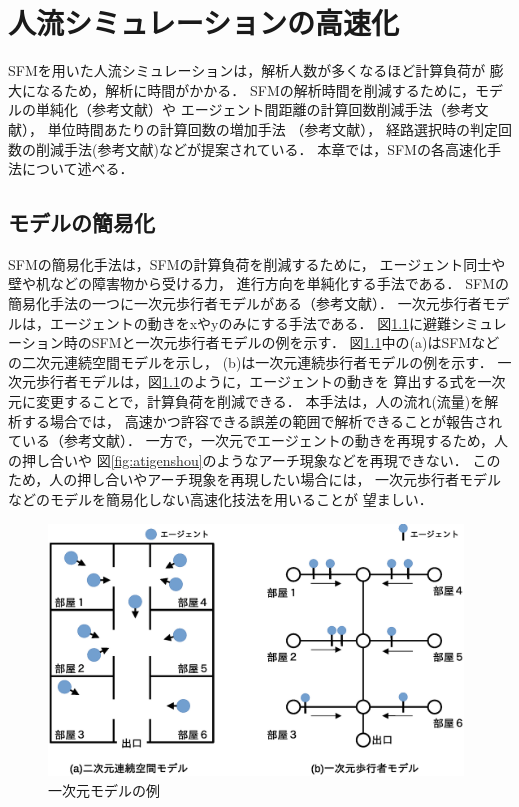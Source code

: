 \chapter{人流シミュレーションの高速化}
\label{sec:survey}
SFMを用いた人流シミュレーションは，解析人数が多くなるほど計算負荷が
膨大になるため，解析に時間がかかる．
SFMの解析時間を削減するために，モデルの単純化（参考文献）や
エージェント間距離の計算回数削減手法（参考文献），
単位時間あたりの計算回数の増加手法 （参考文献），
経路選択時の判定回数の削減手法(参考文献)などが提案されている．
本章では，SFMの各高速化手法について述べる．

\section{モデルの簡易化}
SFMの簡易化手法は，SFMの計算負荷を削減するために，
エージェント同士や壁や机などの障害物から受ける力，
進行方向を単純化する手法である．
SFMの簡易化手法の一つに一次元歩行者モデルがある（参考文献）．
一次元歩行者モデルは，エージェントの動きをxやyのみにする手法である．
図\ref{fig:ichijigen_ex}に避難シミュレーション時のSFMと一次元歩行者モデルの例を示す．
図\ref{fig:ichijigen_ex}中の(a)はSFMなどの二次元連続空間モデルを示し，
(b)は一次元連続歩行者モデルの例を示す．
一次元歩行者モデルは，図\ref{fig:ichijigen_ex}のように，エージェントの動きを
算出する式を一次元に変更することで，計算負荷を削減できる．
本手法は，人の流れ(流量)を解析する場合では，
高速かつ許容できる誤差の範囲で解析できることが報告されている（参考文献）．
一方で，一次元でエージェントの動きを再現するため，人の押し合いや
図\ref{fig:atigenshou}のようなアーチ現象などを再現できない．
このため，人の押し合いやアーチ現象を再現したい場合には，
一次元歩行者モデルなどのモデルを簡易化しない高速化技法を用いることが
望ましい．


\begin{figure}[hbtp]
 \begin{center}
  \includegraphics[width=11cm,clip]{figure/ichijigen_ex.eps}
  \caption{一次元モデルの例}
  \label{fig:ichijigen_ex}
 \end{center}
\end{figure}

